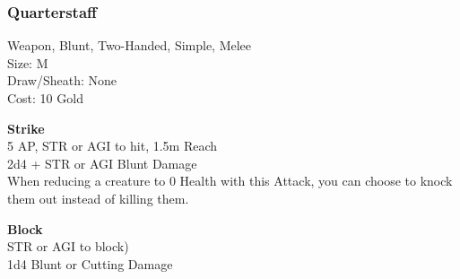 \subsubsection{Quarterstaff}\label{weapon:quarterstaff}
Weapon, Blunt, Two-Handed, Simple, Melee\\
Size: M\\
Draw/Sheath: None\\
Cost: 10 Gold

\textbf{Strike}\\
5 AP, STR or AGI to hit, 1.5m Reach\\
2d4 + \texttimes STR or AGI Blunt Damage\\
When reducing a creature to 0 Health with this Attack, you can choose to knock them out instead of killing them.

\textbf{Block}\\
STR or AGI to block)\\
1d4 Blunt or Cutting Damage

